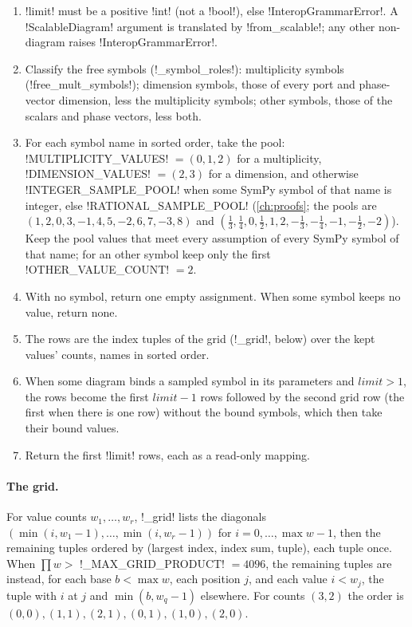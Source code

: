 \begin{algorithm}\label{alg:semantics-default-samples}
\begin{enumerate}
\item \py!limit! must be a positive \py!int! (not a \py!bool!), else \py!InteropGrammarError!. A \py!ScalableDiagram! argument is translated by \py!from_scalable!; any other non-diagram raises \py!InteropGrammarError!.
\item Classify the free symbols (\py!_symbol_roles!): multiplicity symbols (\py!free_mult_symbols!); dimension symbols, those of every port and phase-vector dimension, less the multiplicity symbols; other symbols, those of the scalars and phase vectors, less both.
\item For each symbol name in sorted order, take the pool: \py!MULTIPLICITY_VALUES! $=(0,1,2)$ for a multiplicity, \py!DIMENSION_VALUES! $=(2,3)$ for a dimension, and otherwise \py!INTEGER_SAMPLE_POOL! when some SymPy symbol of that name is integer, else \py!RATIONAL_SAMPLE_POOL! (\cref{ch:proofs}; the pools are $(1,2,0,3,-1,4,5,-2,6,7,-3,8)$ and $(\tfrac13,\tfrac14,0,\tfrac12,1,2,-\tfrac13,-\tfrac14,-1,-\tfrac12,-2)$). Keep the pool values that meet every assumption of every SymPy symbol of that name; for an other symbol keep only the first \py!OTHER_VALUE_COUNT! $=2$.
\item With no symbol, return one empty assignment. When some symbol keeps no value, return none.
\item The rows are the index tuples of the grid (\py!_grid!, below) over the kept values' counts, names in sorted order.
\item When some diagram binds a sampled symbol in its parameters and $\textit{limit}>1$, the rows become the first $\textit{limit}-1$ rows followed by the second grid row (the first when there is one row) without the bound symbols, which then take their bound values.
\item Return the first \py!limit! rows, each as a read-only mapping.
\end{enumerate}
\end{algorithm}

\paragraph{The grid.} For value counts $w_1,\dots,w_r$, \py!_grid! lists the diagonals $(\min(i,w_1-1),\dots,\min(i,w_r-1))$ for $i=0,\dots,\max w-1$, then the remaining tuples ordered by (largest index, index sum, tuple), each tuple once. When $\prod w>$ \py!_MAX_GRID_PRODUCT! $=4096$, the remaining tuples are instead, for each base $b<\max w$, each position $j$, and each value $i<w_j$, the tuple with $i$ at $j$ and $\min(b,w_q-1)$ elsewhere. For counts $(3,2)$ the order is $(0,0),(1,1),(2,1),(0,1),(1,0),(2,0)$.

